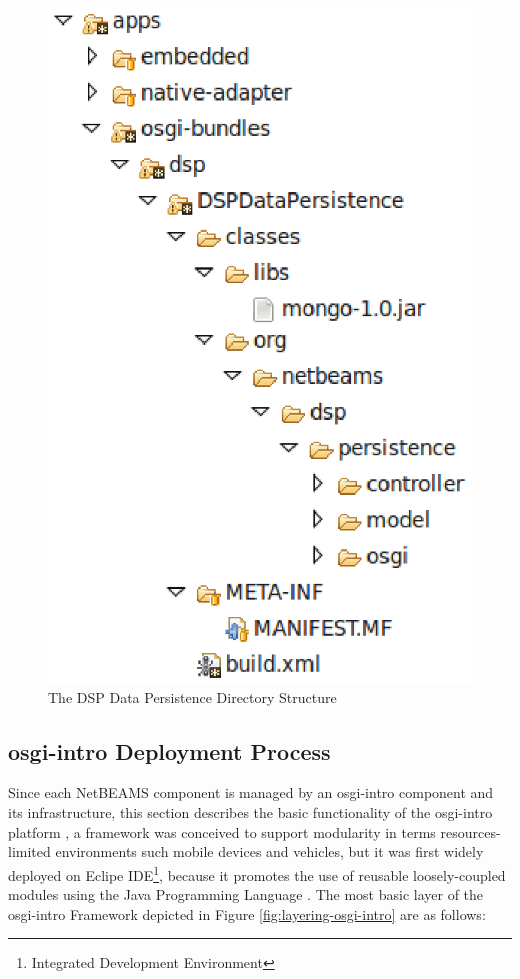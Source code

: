 \begin{figure}[!h]
  \centering
  \includegraphics[scale=0.5]{../diagrams/dsp-data-persistence-dir-checkedout}
  \caption{The DSP Data Persistence Directory Structure}
  \label{fig:dsp-data-persistence-dir-checkedout}
\end{figure}

\subsection{osgi-intro Deployment Process}

Since each NetBEAMS component is managed by an osgi-intro component and its
infrastructure, this section describes the basic functionality of the osgi-intro
platform \cite{osgi-intro}, a framework was conceived to support modularity in
terms resources-limited environments such mobile devices and vehicles, but it
was first widely deployed on Eclipe IDE\footnote{Integrated Development
Environment}, because it promotes the use of reusable loosely-coupled modules
using the Java Programming Language \cite{java}. The most basic layer of the
osgi-intro Framework depicted in Figure \ref{fig:layering-osgi-intro} are as follows:

